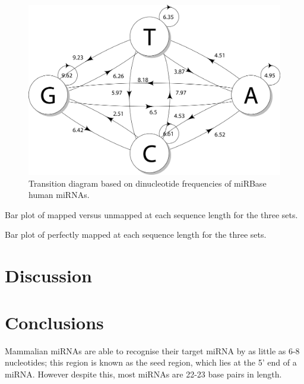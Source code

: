 \documentclass{article}
\begin{document}
\begin{figure}[h]
   \centering
   \includegraphics[width=\textwidth,natwidth=3297,natheight=2227]{image/transition.png}
   \caption{Transition diagram based on dinucleotide frequencies of miRBase human miRNAs.}
   \label{fig:transition}
\end{figure}

Bar plot of mapped versus unmapped at each sequence length for the three sets.

Bar plot of perfectly mapped at each sequence length for the three sets.

\section{Discussion}\label{discussion}

\section{Conclusions}\label{conclusion}

Mammalian miRNAs are able to recognise their target miRNA by as little as 6-8 nucleotides; this region is known as the seed region, which lies at the 5' end of a miRNA. However despite this, most miRNAs are 22-23 base pairs in length.



\end{document}
